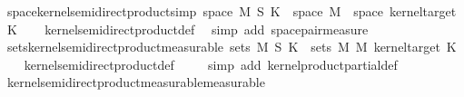 \begin{isabellebody}
{}%
\isamarkupfalse%
\ space{\isacharunderscore}{\kern0pt}kernel{\isacharunderscore}{\kern0pt}semidirect{\isacharunderscore}{\kern0pt}product{\isacharbrackleft}{\kern0pt}simp{\isacharbrackright}{\kern0pt}{\isacharcolon}{\kern0pt}\ {\isachardoublequoteopen}space\ {\isacharparenleft}{\kern0pt}M\ {\isasymOtimes}\isactrlsub S\ K{\isacharparenright}{\kern0pt}\ {\isacharequal}{\kern0pt}\ {\isacharparenleft}{\kern0pt}space\ M\ {\isasymtimes}\ space\ {\isacharparenleft}{\kern0pt}kernel{\isacharunderscore}{\kern0pt}target\ K{\isacharparenright}{\kern0pt}{\isacharparenright}{\kern0pt}{\isachardoublequoteclose}\isanewline
%
\isadelimproof
\ \ %
\endisadelimproof
%
\isatagproof
{}\isamarkupfalse%
\ kernel{\isacharunderscore}{\kern0pt}semidirect{\isacharunderscore}{\kern0pt}product{\isacharunderscore}{\kern0pt}def\ \isamarkupfalse%
\ {\isacharparenleft}{\kern0pt}simp\ add{\isacharcolon}{\kern0pt}\ space{\isacharunderscore}{\kern0pt}pair{\isacharunderscore}{\kern0pt}measure{\isacharparenright}{\kern0pt}%
\endisatagproof
{\isafoldproof}%
%
\isadelimproof
\isanewline
%
\endisadelimproof
\isanewline
{}\isamarkupfalse%
\ sets{\isacharunderscore}{\kern0pt}kernel{\isacharunderscore}{\kern0pt}semidirect{\isacharunderscore}{\kern0pt}product{\isacharbrackleft}{\kern0pt}measurable{\isacharbrackright}{\kern0pt}{\isacharcolon}{\kern0pt}\ {\isachardoublequoteopen}sets\ {\isacharparenleft}{\kern0pt}M\ {\isasymOtimes}\isactrlsub S\ K{\isacharparenright}{\kern0pt}\ {\isacharequal}{\kern0pt}\ sets\ {\isacharparenleft}{\kern0pt}M\ {\isasymOtimes}\isactrlsub M\ {\isacharparenleft}{\kern0pt}kernel{\isacharunderscore}{\kern0pt}target\ K{\isacharparenright}{\kern0pt}{\isacharparenright}{\kern0pt}{\isachardoublequoteclose}\isanewline
%
\isadelimproof
\ \ %
\endisadelimproof
%
\isatagproof
{}\isamarkupfalse%
\ kernel{\isacharunderscore}{\kern0pt}semidirect{\isacharunderscore}{\kern0pt}product{\isacharunderscore}{\kern0pt}def\ \isanewline
\ \ \isamarkupfalse%
\ {\isacharparenleft}{\kern0pt}simp\ add{\isacharcolon}{\kern0pt}\ kernel{\isacharunderscore}{\kern0pt}product{\isacharunderscore}{\kern0pt}partial{\isacharunderscore}{\kern0pt}def{\isacharparenright}{\kern0pt}%
\endisatagproof
{\isafoldproof}%
%
\isadelimproof
\isanewline
%
\endisadelimproof
\isanewline
{}\isamarkupfalse%
\ kernel{\isacharunderscore}{\kern0pt}semidirect{\isacharunderscore}{\kern0pt}product{\isacharunderscore}{\kern0pt}measurable{\isacharbrackleft}{\kern0pt}measurable{\isacharbrackright}{\kern0pt}{\isacharcolon}{\kern0pt}\ \isanewline

\end{isabellebody}
